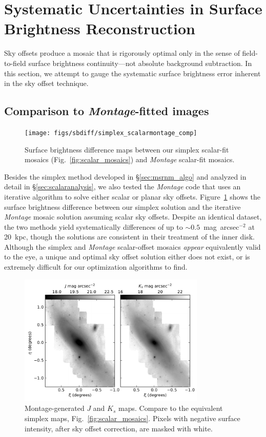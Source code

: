 \documentclass[iop]{emulateapj}
\newcommand{\sw}[1]{\textit{#1}} %
\newcommand{\Fig}[1]{Fig.~\ref{fig:#1}}  %
\newcommand{\Sec}[1]{\S\ref{sec:#1}}  %
\begin{document}
\section{Systematic Uncertainties in Surface Brightness Reconstruction}
\label{sec:systematics}

Sky offsets produce a mosaic that is rigorously optimal only in the sense of field-to-field surface brightness continuity---not absolute background subtraction.
In this section, we attempt to gauge the systematic surface brightness error inherent in the sky offset technique.

\subsection{Comparison to \sw{Montage}-fitted images}

\begin{figure}[t]
    \centering
        \texttt{[image: figs/sbdiff/simplex\_scalarmontage\_comp]}
        \caption{Surface brightness difference maps between our simplex scalar-fit mosaics (\Fig{scalar_mosaics}) and \sw{Montage} scalar-fit mosaics.}
    \label{fig:simplex_scalarmontage_comp}
\end{figure}

Besides the simplex method developed in \Sec{msrnm_algo} and analyzed in detail in \Sec{scalaranalysis}, we also tested the \sw{Montage} code that uses an iterative algorithm to solve either scalar or planar sky offsets.
Figure~\ref{fig:simplex_scalarmontage_comp} shows the surface brightness difference between our simplex solution and the iterative \sw{Montage} mosaic solution assuming scalar sky offsets.
Despite an identical dataset, the two methods yield systematically differences of up to $\sim 0.5$~mag~arcsec$^{-2}$ at 20~kpc, though the solutions are consistent in their treatment of the inner disk.
Although the simplex and \sw{Montage} scalar-offset mosaics \emph{appear} equivalently valid to the eye, a unique and optimal sky offset solution either does not exist, or is extremely difficult for our optimization algorithms to find.

\begin{figure}[t]
\centering
\includegraphics[width=3.5in]{figs/montage_planar_mosaics}
\caption{Montage-generated $J$ and $K_s$ maps. Compare to the equivalent simplex maps, \Fig{scalar_mosaics}. Pixels with negative surface intensity, after sky offset correction, are masked with white.}
\label{fig:montage_planar_mosaics}
\end{figure}
\end{document}
